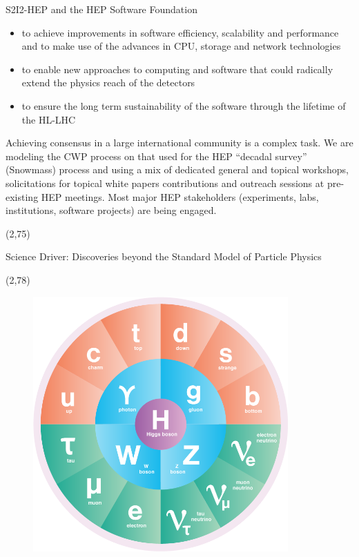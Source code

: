\documentclass[final]{beamer}
\begin{document}
\begin{frame}{}
\begin{textblock}{38.0}
\begin{block}{S2I2-HEP and the HEP Software Foundation}
\begin{itemize}
\item to achieve improvements in software efficiency, scalability and performance and to make use of the advances in CPU, storage and network technologies
\item to enable new approaches to computing and software that could radically extend the physics reach of the detectors
\item to ensure the long term sustainability of the software through the lifetime of the HL-LHC
\end{itemize}

Achieving consensus in a large international community is a complex task. We are modeling the CWP process on that used for the HEP ``decadal survey'' (Snowmass) process and using a mix of dedicated general and topical workshops, solicitations for topical white papers contributions and outreach sessions at pre-existing HEP meetings. Most major HEP stakeholders (experiments, labs, institutions, software projects) are being engaged.
\end{block}
\end{textblock}




\begin{textblock}{80.0}(2,75)
\begin{block}{Science Driver: Discoveries beyond the Standard Model of Particle Physics}

\begin{textblock}{16.0}(2,78)
\begin{figure}[H]
\includegraphics[width=0.87\textwidth]{images/standard_model_ai.png}
\end{figure}
\end{textblock}


\end{block}
\end{textblock}
\end{frame}
\end{document}
